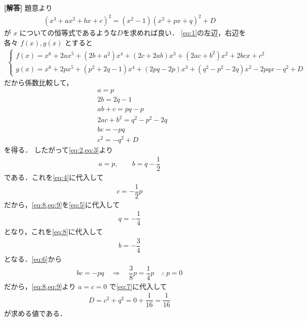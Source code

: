\documentclass[../../main.tex]{subfiles}
\begin{document}
\begin{oframed}
  
\end{oframed}

{\bf [解答]}
題意より
\begin{align}
  (x^3+ax^2+bx+c)^2=(x^2-1)(x^2+px+q)^2+D \label{eq:1}
\end{align}
が $x$ についての恒等式であるような$D$を求めれば良い．
\cref{eq:1}の左辺，右辺を各々 $f(x),g(x)$ とすると
\begin{align}
  \begin{cases}
    f(x)=x^6+2ax^5+(2b+a^2)x^4+(2c+2ab)x^3+(2ac+b^2)x^2+2bcx+c^2 \\
    g(x)=x^6+2px^5+(p^2+2q-1)x^4+(2pq-2p)x^3+(q^2-p^2-2q)x^2-2pqx-q^2+D
  \end{cases}
\end{align}
だから係数比較して，
\begin{align}
  & a=p  \label{eq:2} \\
  & 2b=2q-1 \label{eq:3} \\
  & ab+c=pq-p \label{eq:4} \\
  & 2ac+b^2=q^2-p^2-2q \label{eq:5} \\
  & bc=-pq \label{eq:6} \\
  & c^2=-q^2+D \label{eq:7}
\end{align}
を得る．
したがって\cref{eq:2,eq:3}より
\begin{align}
  a=p, \qquad b=q-\dfrac{1}{2} \label{eq:8}
\end{align}
である．これを\cref{eq:4}に代入して
\begin{align}
  c=-\dfrac{1}{2} p \label{eq:9}
\end{align}
だから，\cref{eq:8,eq:9}を\cref{eq:5}に代入して
\begin{align}
  q=-\dfrac{1}{4} \label{eq:10}
\end{align}
となり，これを\cref{eq:8}に代入して
\begin{align}
  b=-\dfrac{3}{4} \label{eq:11}
\end{align}
となる．\cref{eq:6}から
\begin{align}
  bc=-pq \quad\Longrightarrow\quad \dfrac{3}{8}p=\dfrac{1}{4}p \quad\therefore\ p=0
\end{align}
だから，\cref{eq:8,eq:9}より $a=c=0$ で\cref{eq:7}に代入して
\begin{align}
  D=c^2+q^2=0+\dfrac{1}{16}=\dfrac{1}{16}
\end{align}
が求める値である．

\newpage
\end{document}

